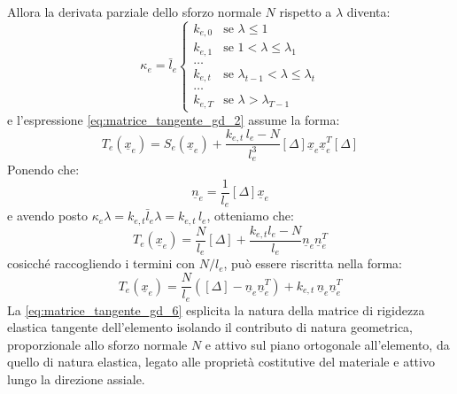Allora la derivata parziale dello sforzo normale $N$ rispetto a $\lambda$ diventa: 
\begin{equation}
    \kappa_{e} = \bar{l}_e
\begin{cases}
    k_{e,0} & \text{se } \lambda \leq 1 \\[6pt]
    k_{e,1} & \text{se } 1 < \lambda \leq \lambda_{1} \\[6pt]
    \dots\\[6pt]
    k_{e,t} & \text{se } \lambda_{t-1} < \lambda \leq \lambda_{t} \\[6pt]
    \dots\\[6pt]
    k_{e,T} & \text{se } \lambda > \lambda_{T-1}
\end{cases}
\label{eq:tension_only2_gd_k}
\end{equation}
e l'espressione \eqref{eq:matrice_tangente_gd_2} assume la forma: 
\begin{equation}
   T_e\left(\underline{x}_e\right) = S_e\left(\underline{x}_e\right) + \frac{k_{e,t}\,l_e - N}{l_e^3} \left[ \Delta \right]\underline{x}_e\underline{x}_e^T[\Delta]
   \label{eq:matrice_tangente_gd_4}
\end{equation}
Ponendo che:
\begin{equation}
    \underline{n}_e = \frac{1}{l_e} \left[ \Delta \right] \underline{x}_e 
    \label{eq:prodotto_esterno}
\end{equation}
e avendo posto $\kappa_{e}\lambda = k_{e,t}\bar{l}_e\lambda = k_{e,t}\,l_e$, otteniamo che:
\begin{equation}
   T_e\left(\underline{x}_e\right) = \frac{N}{l_e} \left[ \Delta \right] + \frac{k_{e,t} l_e - N}{l_e} \underline{n}_e \underline{n}_e^T
   \label{eq:matrice_tangente_gd_5}
\end{equation}
cosicché raccogliendo i termini con $N/l_e$, può essere riscritta nella forma: 
\begin{equation}
   T_e\left(\underline{x}_e\right) = \frac{N}{l_e} \left(\left[ \Delta \right] - \underline{n}_e \underline{n}_e^T\right)  + k_{e,t} \, \underline{n}_e \underline{n}_e^T
   \label{eq:matrice_tangente_gd_6}
\end{equation}
La \cref{eq:matrice_tangente_gd_6} esplicita la natura della matrice di rigidezza elastica tangente dell'elemento isolando il contributo di natura geometrica, proporzionale allo sforzo normale $N$ e attivo sul piano ortogonale all'elemento, da quello di natura elastica, legato alle proprietà costitutive del materiale e attivo lungo la direzione assiale. 

